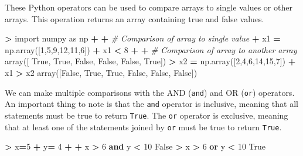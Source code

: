 \documentclass[
]{book}
\newenvironment{Shaded}{\begin{snugshade}}{\end{snugshade}}
\newcommand{\CommentTok}[1]{\textcolor[rgb]{0.56,0.35,0.01}{\textit{#1}}}
\newcommand{\DecValTok}[1]{\textcolor[rgb]{0.00,0.00,0.81}{#1}}
\newcommand{\ImportTok}[1]{#1}
\newcommand{\KeywordTok}[1]{\textcolor[rgb]{0.13,0.29,0.53}{\textbf{#1}}}
\newcommand{\NormalTok}[1]{#1}
\newcommand{\OperatorTok}[1]{\textcolor[rgb]{0.81,0.36,0.00}{\textbf{#1}}}
\newcommand{\VariableTok}[1]{\textcolor[rgb]{0.00,0.00,0.00}{#1}}
\begin{document}
These Python operators can be used to compare arrays to single values or other arrays. This operation returns an array containing true and false values.

\begin{Shaded}
\begin{Highlighting}[]
\OperatorTok{\textgreater{}} \ImportTok{import}\NormalTok{ numpy }\ImportTok{as}\NormalTok{ np }
\OperatorTok{+} 
\OperatorTok{+} \CommentTok{\# Comparison of array to single value}
\OperatorTok{+}\NormalTok{ x1 }\OperatorTok{=}\NormalTok{ np.array([}\DecValTok{1}\NormalTok{,}\DecValTok{5}\NormalTok{,}\DecValTok{9}\NormalTok{,}\DecValTok{12}\NormalTok{,}\DecValTok{11}\NormalTok{,}\DecValTok{6}\NormalTok{])}
\OperatorTok{+}\NormalTok{ x1 }\OperatorTok{\textless{}} \DecValTok{8}
\OperatorTok{+} 
\OperatorTok{+} \CommentTok{\# Comparison of array to another array }
\NormalTok{array([ }\VariableTok{True}\NormalTok{,  }\VariableTok{True}\NormalTok{, }\VariableTok{False}\NormalTok{, }\VariableTok{False}\NormalTok{, }\VariableTok{False}\NormalTok{,  }\VariableTok{True}\NormalTok{])}
\OperatorTok{\textgreater{}}\NormalTok{ x2 }\OperatorTok{=}\NormalTok{ np.array([}\DecValTok{2}\NormalTok{,}\DecValTok{4}\NormalTok{,}\DecValTok{6}\NormalTok{,}\DecValTok{14}\NormalTok{,}\DecValTok{15}\NormalTok{,}\DecValTok{7}\NormalTok{])}
\OperatorTok{+}\NormalTok{ x1 }\OperatorTok{\textgreater{}}\NormalTok{ x2}
\NormalTok{array([}\VariableTok{False}\NormalTok{,  }\VariableTok{True}\NormalTok{,  }\VariableTok{True}\NormalTok{, }\VariableTok{False}\NormalTok{, }\VariableTok{False}\NormalTok{, }\VariableTok{False}\NormalTok{])}
\end{Highlighting}
\end{Shaded}

We can make multiple comparisons with the AND (\texttt{and}) and OR (\texttt{or}) operators. An important thing to note is that the \texttt{and} operator is inclusive, meaning that all statements must be true to return \texttt{True}. The \texttt{or} operator is exclusive, meaning that at least one of the statements joined by \texttt{or} must be true to return \texttt{True}.

\begin{Shaded}
\begin{Highlighting}[]
\OperatorTok{\textgreater{}}\NormalTok{ x}\OperatorTok{=}\DecValTok{5} 
\OperatorTok{+}\NormalTok{ y}\OperatorTok{=} \DecValTok{4}
\OperatorTok{+} 
\OperatorTok{+}\NormalTok{ x }\OperatorTok{\textgreater{}} \DecValTok{6} \KeywordTok{and}\NormalTok{ y }\OperatorTok{\textless{}} \DecValTok{10}
\VariableTok{False}
\OperatorTok{\textgreater{}}\NormalTok{ x }\OperatorTok{\textgreater{}} \DecValTok{6} \KeywordTok{or}\NormalTok{ y }\OperatorTok{\textless{}} \DecValTok{10}
\VariableTok{True}
\end{Highlighting}
\end{Shaded}
\end{document}
